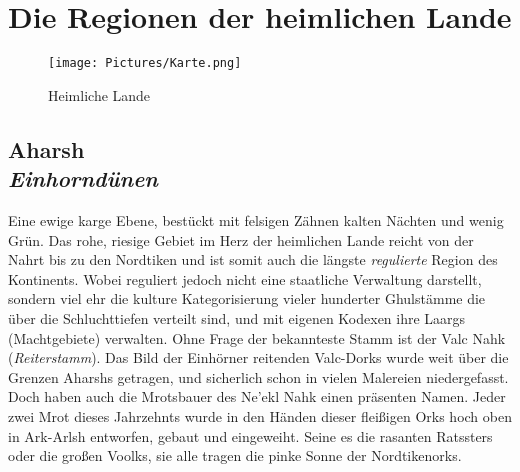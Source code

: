 \chapter{Die Regionen der heimlichen Lande}


    \begin{figure*}[t]
		\texttt{[image: Pictures/Karte.png]}
		\caption{Heimliche Lande}
        \label{fig:Heimliche_Lande}
    \end{figure*}
    
\section*{Aharsh \\ \textit{Einhorndünen}}
Eine ewige karge Ebene, bestückt mit felsigen Zähnen kalten Nächten und wenig Grün. Das rohe, riesige Gebiet im Herz der heimlichen Lande reicht von der Nahrt bis zu den Nordtiken und ist somit auch die längste \textit{regulierte} Region des Kontinents. Wobei reguliert jedoch nicht eine staatliche Verwaltung darstellt, sondern viel ehr die kulture Kategorisierung vieler hunderter Ghulstämme die über die Schluchttiefen verteilt sind, und mit eigenen Kodexen ihre Laargs (Machtgebiete) verwalten. Ohne Frage der bekannteste Stamm ist der Valc Nahk (\textit{Reiterstamm}). Das Bild der Einhörner reitenden Valc-Dorks wurde weit über die Grenzen Aharshs getragen, und sicherlich schon in vielen Malereien niedergefasst. Doch haben auch die Mrotsbauer des Ne'ekl Nahk einen präsenten Namen. Jeder zwei Mrot dieses Jahrzehnts wurde in den Händen dieser fleißigen Orks hoch oben in Ark-Arlsh entworfen, gebaut und eingeweiht. Seine es die rasanten Ratssters oder die großen Voolks, sie alle tragen die pinke Sonne der Nordtikenorks.

